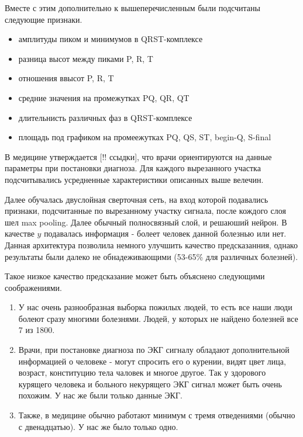 Вместе с этим дополнительно к вышеперечисленным были подсчитаны следующие признаки.

\begin{itemize}
	\item амплитуды пиком и минимумов в QRST-комплексе
	\item разница высот между пиками P, R, T
	\item отношения ввысот P, R, T
	\item средние значения на промежутках PQ, QR, QT
	\item длительнисть различных фаз в QRST-комплексе
	\item площадь под графиком на промеежутках PQ, QS, ST, begin-Q, S-final
\end{itemize}
В медицине утверждается [!! ссыдки], что врачи ориентируются на данные параметры при постановки диагноза.
Для каждого вырезанного участка подсчитывались усредненные характеристики описанных выше велечин.

Далее обучалась двуслойная сверточная сеть, на вход которой подавались признаки, подсчитанные по вырезанному участку сигнала, после кождого слоя шел max pooling. Далее обычный полносвязный слой, и решаюший нейрон. В качестве $y$ подавалась информация - болеет человек данной болезнью или нет. Данная архитектура позволила немного улучшить качество предсказанния, однако результаты были далеко не обнадеживающими (53-65\% для различных болезней).

Такое низкое качество предсказание может быть объяснено следующими соображениями.
\begin{enumerate}
	\item У нас очень разнообразная выборка пожилых людей, то есть все наши люди болеют сразу многими болезнями. Людей, у которых не найдено болезней все 7 из 1800.
	\item Врачи, при постановке диагноза по ЭКГ сигналу обладают дополнительной информацией о человеке - могут спросить его о курении, видят цвет лица, возраст, конституцию тела чаловек и многое другое. Так у здорового курящего человека и больного некурящего ЭКГ сигнал может быть очень похожим. У нас же были только данные ЭКГ.
	\item  Также, в медицине обычно работают минимум с тремя отведениями (обычно с двенадцатью). У нас же было только одно.
\end{enumerate}








